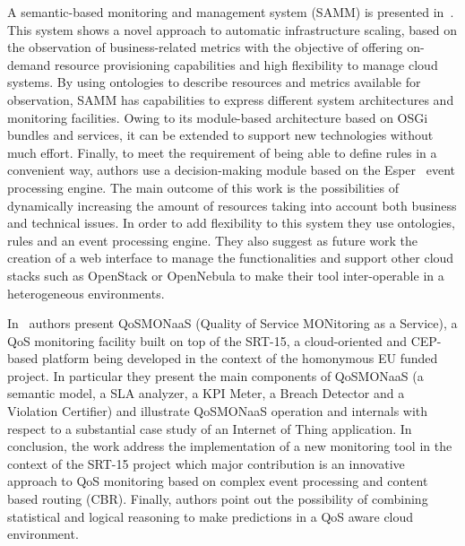 A semantic-based monitoring and management system (SAMM) is presented in~\cite{fg-2266}. 
This system shows a novel approach to automatic infrastructure scaling, based on 
the observation of business-related metrics with the objective of offering 
on-demand resource provisioning capabilities and high flexibility to manage 
cloud systems. By using ontologies to describe resources and metrics available 
for observation, SAMM has capabilities to express different system architectures 
and monitoring facilities. Owing to its module-based architecture based on OSGi 
bundles and services, it can be extended to support new technologies without 
much effort. Finally, to meet the requirement of being able to define rules in a 
convenient way, authors use a decision-making module based on the Esper~\cite{esper-project} event 
processing engine. The main outcome of this work is the possibilities of 
dynamically increasing the amount of resources taking into account both business 
and technical issues. In order to add flexibility to this system they use 
ontologies, rules and an event processing engine. They also suggest as future 
work the creation of a web interface to manage the functionalities and support 
other cloud stacks such as OpenStack or OpenNebula to make their tool 
inter-operable in a heterogeneous environments.


In~\cite{srt-15} authors present QoSMONaaS (Quality of Service MONitoring as a Service), 
a QoS monitoring facility built on top of the SRT-15, a cloud-oriented and 
CEP-based platform being developed in the context of the homonymous EU funded 
project. In particular they present the main components of QoSMONaaS (a semantic 
model, a SLA analyzer, a KPI Meter, a Breach Detector and a Violation Certifier) 
and illustrate QoSMONaaS operation and internals with respect to a substantial 
case study of an Internet of Thing application. In conclusion, the work address 
the implementation of a new monitoring tool in the context of the SRT-15 project 
which major contribution is an innovative approach to QoS monitoring based on 
complex event processing and content based routing (CBR). Finally, authors point 
out the possibility of combining statistical and logical reasoning to make 
predictions in a QoS aware cloud environment.


